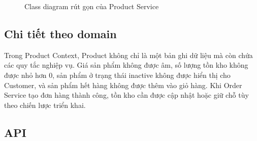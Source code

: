 \documentclass[../main.tex]{subfiles}
\begin{document}
\begin{figure}[H]
    \centering
    \caption{Class diagram rút gọn của Product Service}
    \label{fig:chapter2-product-model-diagram}
\end{figure}

\subsection{Chi tiết theo domain}
\label{subsection:2.3.3}

Trong Product Context, Product không chỉ là một bản ghi dữ liệu mà còn chứa các quy tắc nghiệp vụ. Giá sản phẩm không được âm, số lượng tồn kho không được nhỏ hơn 0, sản phẩm ở trạng thái inactive không được hiển thị cho Customer, và sản phẩm hết hàng không được thêm vào giỏ hàng. Khi Order Service tạo đơn hàng thành công, tồn kho cần được cập nhật hoặc giữ chỗ tùy theo chiến lược triển khai.

\subsection{API}
\label{subsection:2.3.4}
\end{document}
